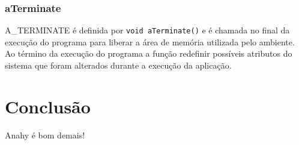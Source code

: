 \documentclass[12pt]{article}
\begin{document}
\subsubsection*{aTerminate}

A\_TERMINATE é definida por \texttt{void aTerminate()} e é chamada no final da execução do programa para liberar a área de memória 
utilizada pelo ambiente. Ao término da execução do programa a função redefinir possíveis atributos do sistema que foram alterados 
durante a execução da aplicação.



\section{Conclusão} %
\label{sec:conclusao}

Anahy é bom demais!




\end{document}
